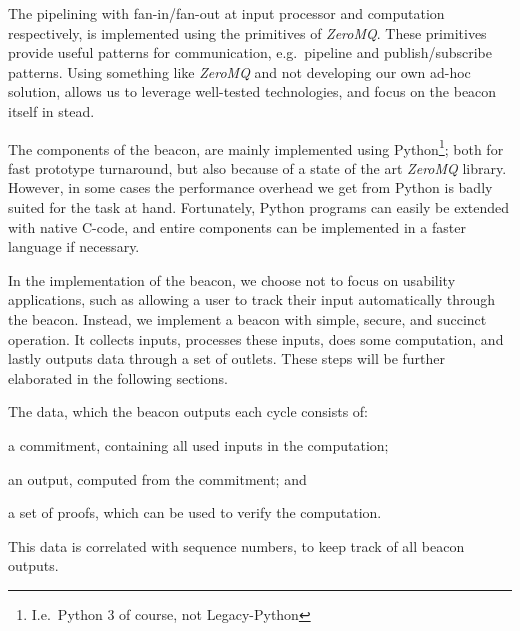 The pipelining with fan-in/fan-out at input processor and computation respectively, is implemented using the primitives of \textit{ZeroMQ}.
These primitives provide useful patterns for communication, e.g.\ pipeline and publish/subscribe patterns.
Using something like \textit{ZeroMQ} and not developing our own ad-hoc solution, allows us to leverage well-tested technologies, and focus on the beacon itself in stead.

The components of the beacon, are mainly implemented using Python\footnote{I.e.\ Python 3 of course, not Legacy-Python}; both for fast prototype turnaround, but also because of a state of the art \textit{ZeroMQ} library.
However, in some cases the performance overhead we get from Python is badly suited for the task at hand.
Fortunately, Python programs can easily be extended with native C-code, and entire components can be implemented in a faster language if necessary.

In the implementation of the beacon, we choose not to focus on usability applications, such as allowing a user to track their input automatically through the beacon.
Instead, we implement a beacon with simple, secure, and succinct operation.
It collects inputs, processes these inputs, does some computation, and lastly outputs data through a set of outlets.
These steps will be further elaborated in the following sections.

The data, which the beacon outputs each cycle consists of:
\begin{eletterate*}
\item a commitment, containing all used inputs in the computation;
\item an output, computed from the commitment; and
\item a set of proofs, which can be used to verify the computation.
\end{eletterate*}
This data is correlated with sequence numbers, to keep track of all beacon outputs.

